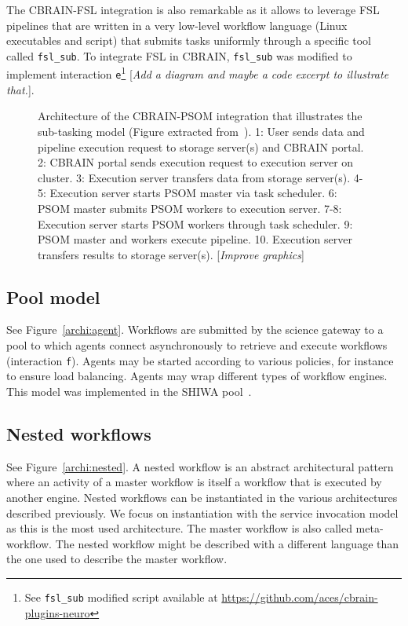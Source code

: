 \documentclass[preprint,3p,twocolumn]{elsarticle}
\newcommand{\todo}[1]{\color{blue}\xspace[\emph{#1}]\xspace\color{black}}
\begin{document}
The CBRAIN-FSL integration is also remarkable as it allows to leverage
FSL pipelines that are written in a very low-level workflow language
(Linux executables and script) that submits tasks uniformly through a
specific tool called \texttt{fsl\_sub}. To integrate FSL in CBRAIN,
\texttt{fsl\_sub} was modified to implement interaction
\texttt{e}\footnote{See \texttt{fsl\_sub} modified script available at
  \url{https://github.com/aces/cbrain-plugins-neuro}} \todo{Add a
  diagram and maybe a code excerpt to illustrate that.}.

\begin{figure}
\def\svgwidth{\columnwidth}

\caption{Architecture of the CBRAIN-PSOM integration that illustrates
  the sub-tasking model (Figure extracted from~\cite{GLAT-16}). 1:
  User sends data and pipeline execution request to storage server(s)
  and CBRAIN portal. 2: CBRAIN portal sends execution request to
  execution server on cluster. 3: Execution server transfers data from
  storage server(s). 4-5: Execution server starts PSOM master via task
  scheduler. 6: PSOM master submits PSOM workers to execution
  server. 7-8: Execution server starts PSOM workers through task
  scheduler. 9: PSOM master and workers execute pipeline. 10.
  Execution server transfers results to storage server(s). \todo{Improve graphics}}
\label{fig:cbrain-psom-architecture}
\end{figure}


\subsection{Pool model}
\label{sec:pool}
See Figure~\ref{archi:agent}. Workflows are submitted by the science
gateway to a pool to which agents connect asynchronously to retrieve
and execute workflows (interaction \texttt{f}). Agents may be started
according to various policies, for instance to ensure load
balancing. Agents may wrap different types of workflow engines. This
model was implemented in the SHIWA pool~\cite{ROGE-13}.

\subsection{Nested workflows}

See Figure~\ref{archi:nested}. A nested workflow is an abstract
architectural pattern where an activity of a master workflow is itself
a workflow that is executed by another engine. Nested workflows can be
instantiated in the various architectures described previously. We
focus on instantiation with the service invocation model as this is
the most used architecture. The master workflow is also called
meta-workflow. The nested workflow might be described with a different
language than the one used to describe the master workflow.
\end{document}
